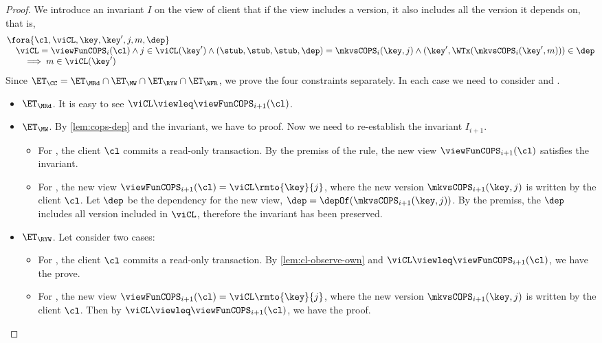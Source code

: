 \begin{proof}
    We introduce an invariant \( I \) on the view of client that if the view includes a version, 
    it also includes all the version it depends on, that is,
    \[
        \begin{array}{@{}l@{}}
        \fora{\cl, \viCL,\key,\key',j,m,\dep} \\
        \quad \viCL = \viewFunCOPS_i(\cl) \land j \in \viCL(\key') 
        \land (\stub,\stub,\stub,\dep) = \mkvsCOPS_i(\key,j)
        \land (\key',\WTx(\mkvsCOPS_i(\key',m))) \in \dep \\
        \qquad \implies m \in \viCL(\key')
        \end{array}
    \]
    Since \( \ET_\CC = \ET_\MRd \cap \ET_\MW \cap \ET_\RYW \cap \ET_\WFR \), we prove the four constraints separately.
    In each case we need to consider  and .
    \begin{itemize}
        \item \( \ET_\MRd \). 
            It is easy to see \( \viCL \viewleq \viewFunCOPS_{i+1}(\cl) \).

        \item \( \ET_\MW \).
            By \cref{lem:cops-dep} and the invariant, we have to proof.
            Now we need to re-establish the invariant \( I_{i+1} \).
            \begin{itemize}
                \item 
                For , the client \( \cl \) commits a read-only transaction.
                By the premiss of the rule, the new view \( \viewFunCOPS_{i+1}(\cl) \) satisfies the invariant.
                \item For , the new view \( \viewFunCOPS_{i+1}(\cl) = \viCL\rmto{\key}{j} \),
                where the new version \( \mkvsCOPS_{i+1}(\key,j)\) is written by the client \( \cl \).
                Let \( \dep \) be the dependency for the new view, \ie \( \dep = \depOf(\mkvsCOPS_{i+1}(\key,j)) \).
                By the premiss, the \( \dep \) includes all version included in \( \viCL \), 
                therefore the invariant has been preserved.
            \end{itemize}

        \item \( \ET_\RYW \). Let consider two cases:
            \begin{itemize}
                \item 
                For , the client \( \cl \) commits a read-only transaction.
                By \cref{lem:cl-observe-own} and  \( \viCL \viewleq \viewFunCOPS_{i+1}(\cl) \),
                we have the prove.
            \item For , the new view \( \viewFunCOPS_{i+1}(\cl) = \viCL\rmto{\key}{j} \),
                where the new version \( \mkvsCOPS_{i+1}(\key,j)\) is written by the client \( \cl \).
                Then by \( \viCL \viewleq \viewFunCOPS_{i+1}(\cl) \), we have the proof.
            \end{itemize}


\end{itemize}
\end{proof}

